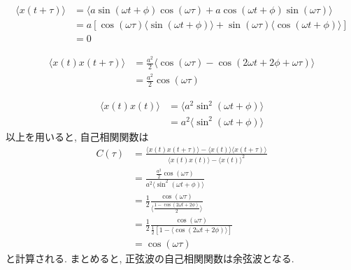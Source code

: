 \begin{align}
    \langle x(t+\tau) \rangle
    &=
    \langle
        a \sin(\omega t + \phi) \cos(\omega \tau) +
        a \cos(\omega t + \phi) \sin(\omega \tau)
    \rangle \\
    &=
    a [\cos(\omega \tau) \langle \sin(\omega t + \phi) \rangle +
       \sin(\omega \tau) \langle \cos(\omega t + \phi) \rangle ]\\
    &=
    0
\end{align}

\begin{align}
    \langle x(t) x(t+\tau) \rangle
    &=
    \frac{a^{2}}{2}
    \langle
        \cos(\omega \tau) - \cos(2\omega t + 2\phi + \omega \tau)
    \rangle \\
    &=
    \frac{a^{2}}{2} \cos(\omega \tau)
\end{align}

\begin{align}
    \langle x(t) x(t) \rangle
    &=
    \langle
        a^{2} \sin^{2} (\omega t + \phi)
    \rangle \\
    &=
    a^{2} \langle \sin^{2}(\omega t + \phi) \rangle
\end{align}
以上を用いると, 自己相関関数は
\begin{align}
    C(\tau)
    &=
    \frac{\langle x(t) x(t + \tau) \rangle - \langle x(t) \rangle \langle x(t + \tau) \rangle}{\langle x(t) x(t) \rangle - \langle x(t) \rangle^{2}} \\
    &=
    \frac{\frac{a^{2}}{2} \cos(\omega \tau)}{a^{2} \langle \sin^{2}(\omega t + \phi)
    \rangle} \\
    &=
    \frac{1}{2}
    \frac{\cos(\omega \tau)}{\langle \frac{1-\cos(2\omega t + 2\phi)}{2}\rangle} \\
    &=
    \frac{1}{2}
    \frac{\cos(\omega \tau)}{\frac{1}{2} [1 - \langle \cos(2\omega t + 2\phi) \rangle]} \\
    &=
    \cos(\omega \tau)
\end{align}
と計算される.
まとめると, 正弦波の自己相関関数は余弦波となる.


